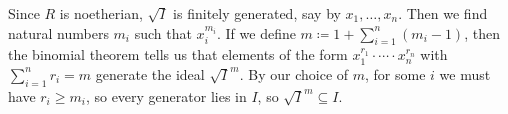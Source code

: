 Since $R$ is noetherian, $\sqrt{I}$ is finitely generated, say by
$x_1, \ldots, x_n$. Then we find natural numbers $m_i$ such that
$x_i^{m_i}$. If we define $m\coloneqq 1 + \sum_{i = 1}^n (m_i - 1)$, then the
binomial theorem tells us that elements of the form $x_1^{r_1}\cdot\cdots\cdot x_n^{r_n}$
with $\sum_{i=1}^nr_i = m$ generate the ideal $\sqrt{I}^m$. By our choice of
$m$, for some $i$ we must have $r_i\geq m_i$, so every generator lies in $I$,
so $\sqrt{I}^m \subseteq I$.

